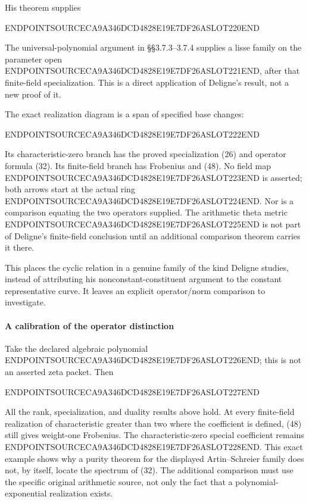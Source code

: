 His theorem supplies

ENDPOINTSOURCECA9A346DCD4828E19E7DF26ASLOT220END

The universal-polynomial argument in §§3.7.3--3.7.4 supplies a lisse family on the parameter open ENDPOINTSOURCECA9A346DCD4828E19E7DF26ASLOT221END, after that finite-field specialization. This is a direct application of Deligne's result, not a new proof of it.

The exact realization diagram is a span of specified base changes:

ENDPOINTSOURCECA9A346DCD4828E19E7DF26ASLOT222END

Its characteristic-zero branch has the proved specialization (26) and operator formula (32). Its finite-field branch has Frobenius and (48). No field map ENDPOINTSOURCECA9A346DCD4828E19E7DF26ASLOT223END is asserted; both arrows start at the actual ring ENDPOINTSOURCECA9A346DCD4828E19E7DF26ASLOT224END. Nor is a comparison equating the two operators supplied. The arithmetic theta metric ENDPOINTSOURCECA9A346DCD4828E19E7DF26ASLOT225END is not part of Deligne's finite-field conclusion until an additional comparison theorem carries it there.

This places the cyclic relation in a genuine family of the kind Deligne studies, instead of attributing his nonconstant-constituent argument to the constant representative curve. It leaves an explicit operator/norm comparison to investigate.

\paragraph{A calibration of the operator distinction}\label{endpoint-exponential_original--a-calibration-of-the-operator-distinction}

Take the declared algebraic polynomial ENDPOINTSOURCECA9A346DCD4828E19E7DF26ASLOT226END; this is not an asserted zeta packet. Then

ENDPOINTSOURCECA9A346DCD4828E19E7DF26ASLOT227END

All the rank, specialization, and duality results above hold. At every finite-field realization of characteristic greater than two where the coefficient is defined, (48) still gives weight-one Frobenius. The characteristic-zero special coefficient remains ENDPOINTSOURCECA9A346DCD4828E19E7DF26ASLOT228END. This exact example shows why a purity theorem for the displayed Artin--Schreier family does not, by itself, locate the spectrum of (32). The additional comparison must use the specific original arithmetic source, not only the fact that a polynomial-exponential realization exists.

